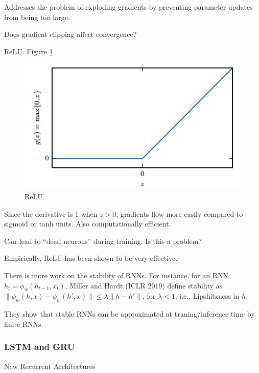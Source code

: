 \documentclass[english]{article}
\begin{document}
Addresses the problem of exploding gradients by preventing parameter updates from being too large.\\
\begin{algorithmic}
\EndIf
\end{algorithmic}
Does gradient clipping affect convergence?
 

\item 
 {ReLU}.  Figure \ref{ReLU}
\begin{figure}
\centering
\includegraphics[height=0.3\linewidth]{relu.png}
    \caption{ReLU.}
    \label{ReLU}
\end{figure}

Since the derivative is 1 when $z>0$, gradients flow more easily compared to sigmoid or tanh units. Also computationally efficient.  

Can lead to ``dead neurons'' during training. Is this a problem? 

Empirically, ReLU has been shown to be very effective.


\item There is more work on the stability of RNNs. For instance, for an RNN $h_t = \phi_w(h_{t-1},x_t)$, Miller and Hardt (ICLR 2019) define stability as $\|\phi_w(h,x)-\phi_w(h',x)\|\le \lambda \|h-h'\|$, for $\lambda<1$, i.e., Lipshitzness in $h$. 

They show that stable RNNs can be approximated at traning/inference time by finite RNNs.

 \eenum

\subsubsection{LSTM and GRU}
\benum
\item 
 {New Recurrent Architectures}
\end{document}

